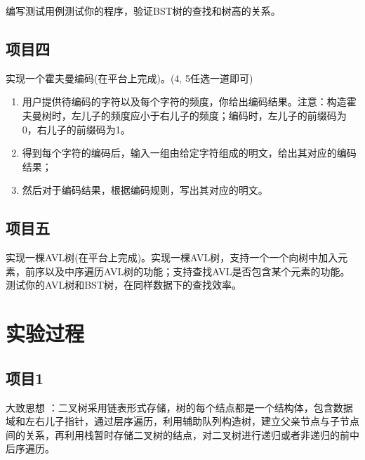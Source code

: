 编写测试用例测试你的程序，验证BST树的查找和树高的关系。

\subsection{项目四}
实现一个霍夫曼编码(在平台上完成)。(4, 5任选一道即可)
\begin{enumerate}
\item 用户提供待编码的字符以及每个字符的频度，你给出编码结果。注意：构造霍夫曼树时，左儿子的频度应小于右儿子的频度；编码时，左儿子的前缀码为0，右儿子的前缀码为1。
\item 得到每个字符的编码后，输入一组由给定字符组成的明文，给出其对应的编码结果；
\item  然后对于编码结果，根据编码规则，写出其对应的明文。
\end{enumerate}

\subsection{项目五}
实现一棵AVL树(在平台上完成)。实现一棵AVL树，支持一个一个向树中加入元素，前序以及中序遍历AVL树的功能；支持查找AVL是否包含某个元素的功能。测试你的AVL树和BST树，在同样数据下的查找效率。


\section{实验过程}
\subsection{项目1}
大致思想 ：二叉树采用链表形式存储，树的每个结点都是一个结构体，包含数据域和左右儿子指针，通过层序遍历，利用辅助队列构造树，建立父亲节点与子节点间的关系，再利用栈暂时存储二叉树的结点，对二叉树进行递归或者非递归的前中后序遍历。
